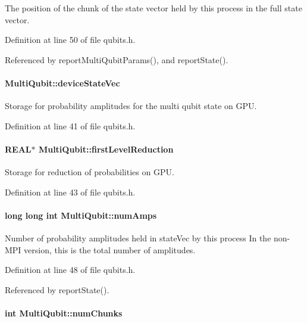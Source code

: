 The position of the chunk of the state vector held by this process in the full state vector. 

Definition at line 50 of file qubits.h.

Referenced by reportMultiQubitParams(), and reportState().\hypertarget{structMultiQubit_a59ac613486a41b8c9a4b6e79cc8d2cc3}{
\paragraph[{deviceStateVec}]{ {\bf MultiQubit::deviceStateVec}}\hfill}
\label{structMultiQubit_a59ac613486a41b8c9a4b6e79cc8d2cc3}


Storage for probability amplitudes for the multi qubit state on GPU. 

Definition at line 41 of file qubits.h.\hypertarget{structMultiQubit_a4e0088b41adab0a40b7a31e528ed42b5}{
\paragraph[{firstLevelReduction}]{\setlength{\rightskip}{0pt plus 5cm}REAL$\ast$ {\bf MultiQubit::firstLevelReduction}}\hfill}
\label{structMultiQubit_a4e0088b41adab0a40b7a31e528ed42b5}


Storage for reduction of probabilities on GPU. 

Definition at line 43 of file qubits.h.\hypertarget{structMultiQubit_ae16f47d8b725c914fb7f66b6498d79db}{
\paragraph[{numAmps}]{\setlength{\rightskip}{0pt plus 5cm}long long int {\bf MultiQubit::numAmps}}\hfill}
\label{structMultiQubit_ae16f47d8b725c914fb7f66b6498d79db}


Number of probability amplitudes held in stateVec by this process In the non-\/MPI version, this is the total number of amplitudes. 

Definition at line 48 of file qubits.h.

Referenced by reportState().\hypertarget{structMultiQubit_acd43f2f57991709c9e94f73662c972b2}{
\paragraph[{numChunks}]{\setlength{\rightskip}{0pt plus 5cm}int {\bf MultiQubit::numChunks}}\hfill}
\label{structMultiQubit_acd43f2f57991709c9e94f73662c972b2}



